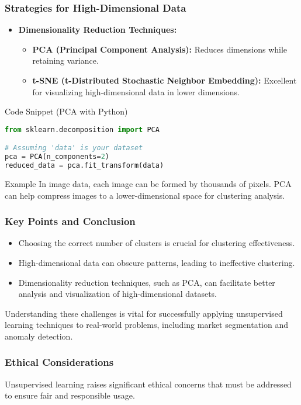 \documentclass[aspectratio=169]{beamer}
\begin{document}
\begin{frame}[fragile]
    \frametitle{Strategies for High-Dimensional Data}
    \begin{itemize}
        \item \textbf{Dimensionality Reduction Techniques:}
        \begin{itemize}
            \item \textbf{PCA (Principal Component Analysis):} Reduces dimensions while retaining variance.
            \item \textbf{t-SNE (t-Distributed Stochastic Neighbor Embedding):} Excellent for visualizing high-dimensional data in lower dimensions.
        \end{itemize}
    \end{itemize}
    \begin{block}{Code Snippet (PCA with Python)}
    \begin{lstlisting}[language=Python]
from sklearn.decomposition import PCA

# Assuming 'data' is your dataset
pca = PCA(n_components=2)
reduced_data = pca.fit_transform(data)
    \end{lstlisting}
    \end{block}
    \begin{block}{Example}
        In image data, each image can be formed by thousands of pixels. PCA can help compress images to a lower-dimensional space for clustering analysis.
    \end{block}
\end{frame}

\begin{frame}[fragile]
    \frametitle{Key Points and Conclusion}
    \begin{itemize}
        \item Choosing the correct number of clusters is crucial for clustering effectiveness.
        \item High-dimensional data can obscure patterns, leading to ineffective clustering.
        \item Dimensionality reduction techniques, such as PCA, can facilitate better analysis and visualization of high-dimensional datasets.
    \end{itemize}
    Understanding these challenges is vital for successfully applying unsupervised learning techniques to real-world problems, including market segmentation and anomaly detection.
\end{frame}

\begin{frame}[fragile]
    \frametitle{Ethical Considerations}
    Unsupervised learning raises significant ethical concerns that must be addressed to ensure fair and responsible usage.
\end{frame}
\end{document}
